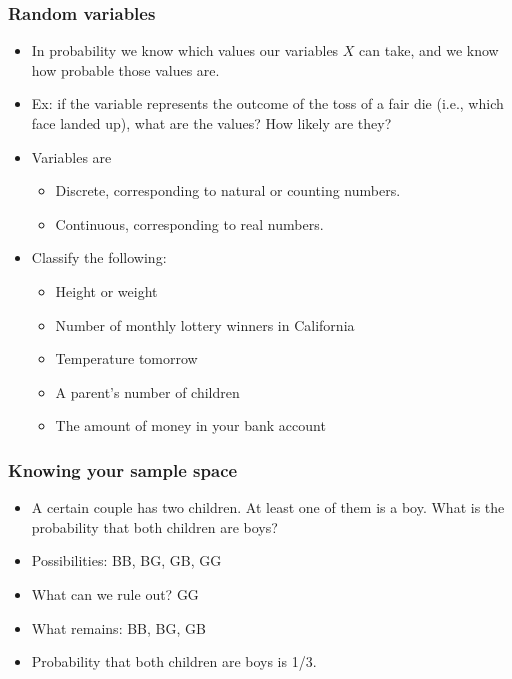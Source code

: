 \documentclass[xcolor=dvipsnames, 9pt]{beamer} %
\begin{document}
\begin{frame}
\frametitle{Random variables}

\begin{itemize}
	\setlength\itemsep{1em}
	\item In probability we know which values our variables $X$ can take, and we know how probable those values are. 
	\item Ex: if the variable represents the outcome of the toss of a fair die (i.e., which face landed up), what are the values? How likely are they? 
	\item Variables are 
		\begin{itemize}
			\item Discrete, corresponding to natural or counting numbers. 
			\item Continuous, corresponding to real numbers. 
		\end{itemize}
	\item Classify the following: 
		\begin{itemize}
			\item Height or weight
			\item Number of monthly lottery winners in California
			\item Temperature tomorrow 
			\item A parent's number of children 
			\item The amount of money in your bank account
		\end{itemize}
\end{itemize}
\end{frame}

\begin{frame}
\frametitle{Knowing your sample space}
\begin{itemize}
\item A certain couple has two children. At least one of them is a boy. What is the probability that both children are boys?
\item Possibilities: BB, BG, GB, GG 
\item What can we rule out? GG 
\item What remains: BB, BG, GB
\item Probability that both children are boys is 1/3. 
\end{itemize}
\end{frame}
\end{document}
